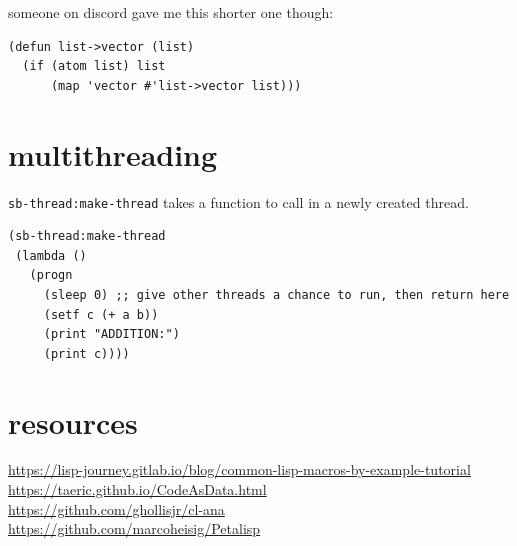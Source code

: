 \documentclass[a4paper,12pt]{article}
\begin{document}
someone on discord gave me this shorter one though:\\
\lstset{language=Lisp,label= ,caption= ,captionpos=b,numbers=none}
\begin{lstlisting}
(defun list->vector (list)
  (if (atom list) list
      (map 'vector #'list->vector list)))
\end{lstlisting}
\section{multithreading}
\label{sec:org966b94d}
\texttt{sb-thread:make-thread} takes a function to call in a newly created thread.\\
\lstset{language=Lisp,label= ,caption= ,captionpos=b,numbers=none}
\begin{lstlisting}
(sb-thread:make-thread
 (lambda ()
   (progn
     (sleep 0) ;; give other threads a chance to run, then return here
     (setf c (+ a b))
     (print "ADDITION:")
     (print c))))
\end{lstlisting}
\section{resources}
\label{sec:org7d64a87}
\url{https://lisp-journey.gitlab.io/blog/common-lisp-macros-by-example-tutorial}\\
\url{https://taeric.github.io/CodeAsData.html}\\
\url{https://github.com/ghollisjr/cl-ana}\\
\url{https://github.com/marcoheisig/Petalisp}
\end{document}
